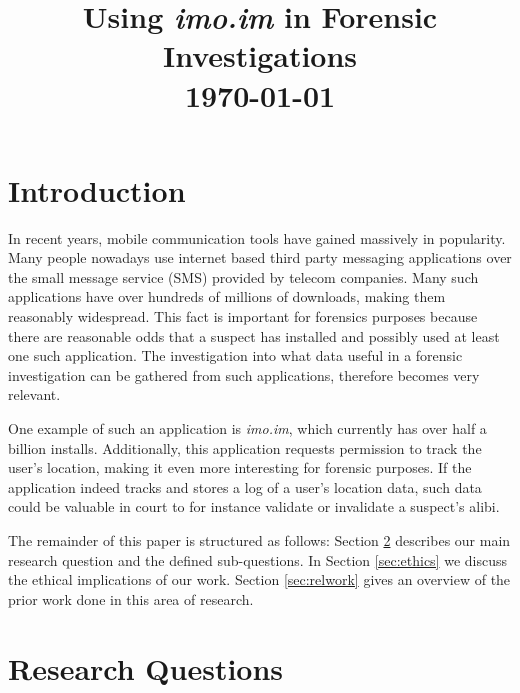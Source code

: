 \documentclass[conference]{IEEEtran}
\begin{document}
\title{Using {\it imo.im} in Forensic Investigations \\\vspace{5mm} \large  \today}
\author{
\and
{}
}
\maketitle
\thispagestyle{plain}
\pagestyle{plain}


\section{Introduction}

In recent years, mobile communication tools have gained massively in popularity.
Many people nowadays use internet based third party messaging applications over
the small message service (SMS) provided by telecom companies.  Many such
applications have over hundreds of millions of downloads, making them reasonably
widespread. This fact is important for forensics purposes because there are
reasonable odds that a suspect has installed and possibly used at least one such
application. The investigation into what data useful in a forensic investigation
can be gathered from such applications, therefore becomes very relevant.

One example of such an application is {\it imo.im}, which currently  has over
half a billion installs. Additionally, this application requests permission to
track the user's location, making it even more interesting for forensic
purposes. If the application indeed tracks and stores a log of a user's location
data, such data could be valuable in court to for instance validate or
invalidate a suspect's alibi.

The remainder of this paper is structured as follows: Section
\ref{sec:researchq} describes our main research question and the defined
sub-questions. In Section \ref{sec:ethics} we discuss the ethical implications
of our work. Section \ref{sec:relwork} gives an overview of the prior work done
in this area of research. %

\section{Research Questions}\label{sec:researchq}
\end{document}

